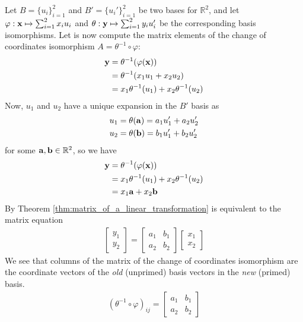 \documentclass[12pt,letterpaper,reqno]{article}
\numberwithin{equation}{section}
\newcommand{\ti}[1]{\textit{#1}}
\begin{document}
\begin{example}
Let $B=\{u_i\}_{i=1}^2$ and $B'=\{u_i'\}_{i=1}^2$ be two bases for $\mathbb{R}^2$, and let $\varphi:{\bf x} \mapsto \sum_{i=1}^2x_iu_i$ and $\theta:{\bf y} \mapsto \sum_{i=1}^2y_iu_i'$ be the corresponding basis isomorphisms. Let is now compute the matrix elements of the change of coordinates isomorphism $A=\theta^{-1} \circ \varphi$:
\begin{align*}
	{\bf y}&=\theta^{-1}(\varphi({\bf x})) \\
		   &=\theta^{-1}(x_1u_1+x_2u_2) \\
		   &=x_1 \theta^{-1}(u_1)+x_2\theta^{-1}(u_2)
\end{align*}
Now, $u_1$ and $u_2$ have a unique expansion in the $B'$ basis as 
\begin{align*}
	u_1&=\theta({\bf a})=a_1u_1'+a_2u_2' \\
	u_2&=\theta({\bf b})=b_1u_1'+b_2u_2'
\end{align*}
for some ${\bf a}, {\bf b} \in \mathbb{R}^2$, so we have
\begin{align*}
	{\bf y}&=\theta^{-1}(\varphi({\bf x})) \\
	 &=x_1 \theta^{-1}(u_1)+x_2\theta^{-1}(u_2) \\
	 &=x_1{\bf a}+ x_2{\bf b}
\end{align*}
By Theorem \ref{thm:matrix_of_a_linear_transformation} is equivalent to the matrix equation
\begin{align*}
	\begin{bmatrix}
		y_1 \\ y_2
	\end{bmatrix} = \begin{bmatrix}
		a_1 & b_1 \\ a_2 & b_2
	\end{bmatrix}\begin{bmatrix}
		x_1 \\ x_2
	\end{bmatrix}
\end{align*}
We see that columns of the matrix of the change of coordinates isomorphism are the coordinate vectors of the \ti{old} (unprimed) basis vectors in the \ti{new} (primed) basis.
\begin{align*}
	(\theta^{-1}\circ \varphi)_{ij}=\begin{bmatrix}
		a_1 & b_1 \\ a_2 & b_2
	\end{bmatrix}
\end{align*}
\end{example}
\end{document}
